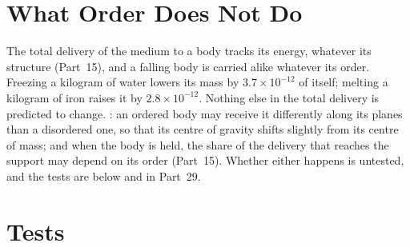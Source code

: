 \documentclass[11pt,a4paper]{article}
\begin{document}
\section{What Order Does Not Do}
\label{sec:notdo}

 The total delivery of the medium to a body tracks its energy, whatever its structure (Part~15), and a falling body is carried alike whatever its order. Freezing a kilogram of water lowers its mass by $3.7\times10^{-12}$ of itself; melting a kilogram of iron raises it by $2.8\times10^{-12}$. Nothing else in the total delivery is predicted to change. : an ordered body may receive it differently along its planes than a disordered one, so that its centre of gravity shifts slightly from its centre of mass; and when the body is held, the share of the delivery that reaches the support may depend on its order (Part~15). Whether either happens is untested, and the tests are below and in Part~29.

\section{Tests}
\label{sec:tests}
\end{document}
